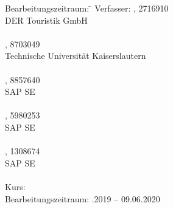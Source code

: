 \begin{titlepage}
\begin{center}
\begin{minipage}{\textwidth}
		\begin{tabbing}
			Bearbeitungszeitraum: \hspace{0.85cm}\=\kill
			Verfasser: \> \authorSG, 2716910 \\
			\> DER Touristik GmbH \\
			\> \\
			\> \authorRF, 8703049 \\
			\> Technische Universität Kaiserslautern \\
			\> \\
			\> \authorMS, 8857640 \\
			\> SAP SE \\
			\> \\
			\> \authorEJ, 5980253 \\
			\> SAP SE \\
			\> \\
			\> \authorNL, 1308674 \\
			\> SAP SE \\
			\> \\[1.5mm]
			Kurs: \> \DieKursbezeichnung \\[1.5mm]
			Bearbeitungszeitraum: .2019 -- 09.06.2020
	\end{tabbing}

	\end{minipage}

\end{center}

\end{titlepage}